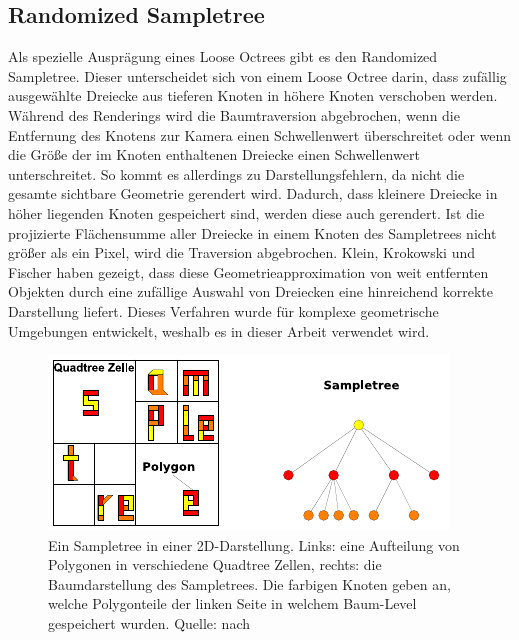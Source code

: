 \subsection{Randomized Sampletree}
\label{sec:basics:sampletree}
Als spezielle Ausprägung eines Loose Octrees gibt es den Randomized Sampletree. Dieser unterscheidet sich von einem Loose Octree darin, dass zufällig ausgewählte Dreiecke aus tieferen Knoten in höhere Knoten verschoben werden. Während des Renderings wird die Baumtraversion abgebrochen, wenn die Entfernung des Knotens zur Kamera einen Schwellenwert überschreitet oder wenn die Größe der im Knoten enthaltenen Dreiecke einen Schwellenwert unterschreitet. So kommt es allerdings zu Darstellungsfehlern, da nicht die gesamte sichtbare Geometrie gerendert wird. Dadurch, dass kleinere Dreiecke in höher liegenden Knoten gespeichert sind, werden diese auch gerendert. Ist die projizierte Flächensumme aller Dreiecke in einem Knoten des Sampletrees nicht größer als ein Pixel, wird die Traversion abgebrochen. Klein, Krokowski und Fischer haben gezeigt, dass diese Geometrieapproximation von weit entfernten Objekten durch eine zufällige Auswahl von Dreiecken eine hinreichend korrekte Darstellung liefert. Dieses Verfahren wurde für komplexe geometrische Umgebungen entwickelt, weshalb es in dieser Arbeit verwendet wird.
\begin{figure}
 \centering
  \includegraphics[scale=1.7]{images/sampletree2.pdf}
  \caption[Ein Sampletree]{Ein Sampletree in einer 2D-Darstellung. Links: eine Aufteilung von Polygonen in verschiedene Quadtree Zellen, rechts: die Baumdarstellung des Sampletrees. Die farbigen Knoten geben an, welche Polygonteile der linken Seite in welchem Baum-Level gespeichert wurden. Quelle: nach}
 \label{fig:basics:sampletree}
\end{figure}


